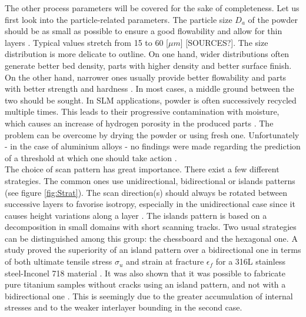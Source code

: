 The other process parameters will be covered for the sake of completeness. Let us first look into the particle-related parameters. The particle size $D_a$ of the powder should be as small as possible to ensure a good flowability and allow for thin layers \parencite{Kempen110817}. Typical values stretch from 15 to 60 [$\mu m$] [SOURCES?]. The size distribution is more delicate to outline. On one hand, wider distributions often generate better bed density, parts with higher density and better surface finish. On the other hand, narrower ones usually provide better flowability and parts with better strength and hardness \parencite{Liu1101}. In most cases, a middle ground between the two should be sought. In SLM applications, powder is often successively recycled multiple times. This leads to their progressive contamination with moisture, which causes an increase of hydrogen porosity in the produced parts \parencite{Weingarten151102}. The problem can be overcome by drying the powder or using fresh one. Unfortunately - in the case of aluminium alloys - no findings were made regarding the prediction of a threshold at which one should take action \parencite{aboulkhair2017}.    \\

The choice of scan pattern has great importance. There exist a few different strategies. The common ones use unidirectional, bidirectional or islands patterns (see figure \ref{fig:Strat}). The scan direction(s) should always be rotated between successive layers to favorise isotropy, especially in the unidirectional case since it causes height variations along a layer \parencite{aboulkhair2016}. The islands pattern is based on a decomposition in small domains with short scanning tracks. Two usual strategies can be distinguished among this group: the chessboard and the hexagonal one. A study proved the superiority of an island pattern over a bidirectional one in terms of both ultimate tensile stress $\sigma_u$ and strain at fracture $\epsilon_f$ for a 316L stainless steel-Inconel 718 material \parencite{Zhou15}. It was also shown that it was possible to fabricate pure titanium samples without cracks using an island pattern, and not with a bidirectional one \parencite{Li17}. This is seemingly due to the greater accumulation of internal stresses and to the weaker interlayer bounding in the second case. \\

